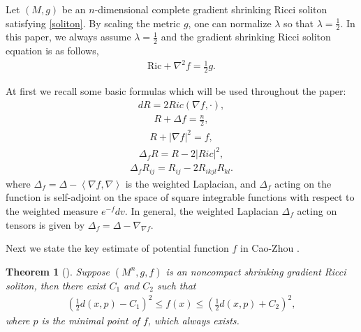 \documentclass[12pt]{amsart}
\newcommand{\ban}{\begin{eqnarray*}}
\newcommand{\ean}{\end{eqnarray*}}
\newtheorem{theo}{Theorem}[section]
\begin{document}
	\smallskip
	Let  $(M, g)$ be an $n$-dimensional complete gradient shrinking Ricci soliton satisfying \eqref{soliton}.
	By scaling the metric $g$,  one can normalize $\lambda$ so that $\lambda=\frac{1}{2}$. In this paper, we always assume $\lambda=\frac{1}{2}$ and the gradient shrinking Ricci soliton equation is as follows,
	\begin{align}\label{soliton'}
	\text{Ric}+\nabla^2f=\frac{1}{2} g.
	\end{align}
	
	At first we recall some basic formulas which will be used throughout the paper:
	\begin{align}\label{second bianchi}
	d R=2 Ric(\nabla f,\cdot),
	\end{align}
	\begin{align}\label{R}
	R+\Delta f=\frac{n}{2},
	\end{align}\begin{align}\label{f he tidu}
	R+|\nabla f|^2=f,
	\end{align}\begin{align}\label{lr}
	\Delta_f R=R-2|Ric|^2,
	\end{align}\begin{align}\label{elliptic equation}
	\Delta_f R_{ij}=R_{ij}-2 R_{ikjl}R_{kl}.
	\end{align}
	where $\Delta _{f}=\Delta -\left\langle \nabla f,\nabla \right\rangle $ is the weighted Laplacian, and $\Delta _{f}$ acting on the function
	is self-adjoint on the space of square integrable functions with respect to the weighted measure $e^{-f}dv.$ In general, the weighted Laplacian $\Delta_f$ acting on tensors is given by $\Delta_f=\Delta-\nabla_{\nabla f}$.
	
	\smallskip
	Next we state the key estimate of potential function $f$ in Cao-Zhou \cite{Cao-Zhou}.
	\begin{theo}[\cite{Cao-Zhou}]\label{potential estimate}  Suppose $(M^n, g, f)$ is an noncompact shrinking gradient Ricci soliton, then there exist $C_1$ and $C_2$ such that
		\ban\label{cao-zhou}
		\left(\frac{1}{2}d(x, p)-C_1\right)^2\leq f(x)\leq \left(\frac{1}{2}d(x, p)+C_2\right)^2,
		\ean
		where $p$ is the minimal point of $f$, which always exists.
	\end{theo}
	
	
	
\end{document}
